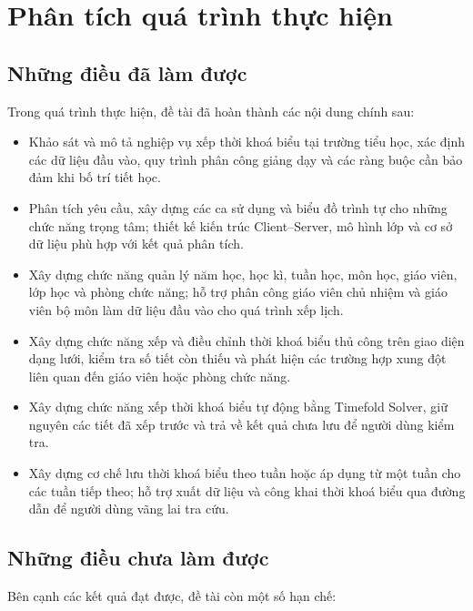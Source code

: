 \documentclass[../DoAn.tex]{subfiles}
\begin{document}
\section{Phân tích quá trình thực hiện}
\label{section:5.2}

\subsection{Những điều đã làm được}

Trong quá trình thực hiện, đề tài đã hoàn thành các nội dung chính sau:

\begin{itemize}[noitemsep]
    \item Khảo sát và mô tả nghiệp vụ xếp thời khoá biểu tại trường tiểu học,
    xác định các dữ liệu đầu vào, quy trình phân công giảng dạy và các ràng buộc
    cần bảo đảm khi bố trí tiết học.
    \item Phân tích yêu cầu, xây dựng các ca sử dụng và biểu đồ trình tự cho
    những chức năng trọng tâm; thiết kế kiến trúc Client--Server, mô hình lớp và
    cơ sở dữ liệu phù hợp với kết quả phân tích.
    \item Xây dựng chức năng quản lý năm học, học kì, tuần học, môn học, giáo
    viên, lớp học và phòng chức năng; hỗ trợ phân công giáo viên chủ nhiệm và
    giáo viên bộ môn làm dữ liệu đầu vào cho quá trình xếp lịch.
    \item Xây dựng chức năng xếp và điều chỉnh thời khoá biểu thủ công trên
    giao diện dạng lưới, kiểm tra số tiết còn thiếu và phát hiện các trường hợp
    xung đột liên quan đến giáo viên hoặc phòng chức năng.
    \item Xây dựng chức năng xếp thời khoá biểu tự động bằng Timefold Solver,
    giữ nguyên các tiết đã xếp trước và trả về kết quả chưa lưu để người dùng
    kiểm tra.
    \item Xây dựng cơ chế lưu thời khoá biểu theo tuần hoặc áp dụng từ một tuần
    cho các tuần tiếp theo; hỗ trợ xuất dữ liệu và công khai thời khoá biểu qua
    đường dẫn để người dùng vãng lai tra cứu.
\end{itemize}

\subsection{Những điều chưa làm được}

Bên cạnh các kết quả đạt được, đề tài còn một số hạn chế:
\end{document}
